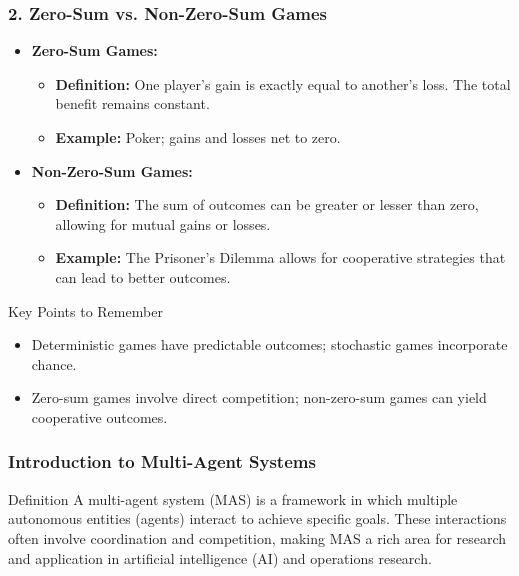 \documentclass[aspectratio=169]{beamer}
\begin{document}
\begin{frame}[fragile]
    \frametitle{2. Zero-Sum vs. Non-Zero-Sum Games}
    \begin{itemize}
        \item \textbf{Zero-Sum Games:}
            \begin{itemize}
                \item \textbf{Definition:} One player's gain is exactly equal to another's loss. The total benefit remains constant.
                \item \textbf{Example:} Poker; gains and losses net to zero.
            \end{itemize}
        
        \item \textbf{Non-Zero-Sum Games:}
            \begin{itemize}
                \item \textbf{Definition:} The sum of outcomes can be greater or lesser than zero, allowing for mutual gains or losses.
                \item \textbf{Example:} The Prisoner's Dilemma allows for cooperative strategies that can lead to better outcomes.
            \end{itemize}
    \end{itemize}
    \begin{block}{Key Points to Remember}
        \begin{itemize}
            \item Deterministic games have predictable outcomes; stochastic games incorporate chance.
            \item Zero-sum games involve direct competition; non-zero-sum games can yield cooperative outcomes.
        \end{itemize}
    \end{block}
\end{frame}

\begin{frame}[fragile]
    \frametitle{Introduction to Multi-Agent Systems}
    \begin{block}{Definition}
        A multi-agent system (MAS) is a framework in which multiple autonomous entities (agents) interact to achieve specific goals. These interactions often involve coordination and competition, making MAS a rich area for research and application in artificial intelligence (AI) and operations research.
    \end{block}
\end{frame}
\end{document}
